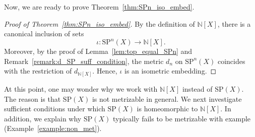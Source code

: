 \documentclass[10pt,a4paper]{article}
\theoremstyle{definition}
\newcommand{\SP}{\mathrm{SP}}
\newcommand{\N}{\mathbb{N}}
\begin{document}
Now, we are ready to prove Theorem~\ref{thm:SPn_iso_embed}.
\begin{proof}[Proof of Theorem~\ref{thm:SPn_iso_embed}]
By the definition of $\N[X]$, there is a canonical inclusion of sets
\[
\iota \colon \SP^n(X) \longrightarrow \N[X].
\]
Moreover, by the proof of Lemma~\ref{lem:top_equal_SPn} and
Remark~\ref{remark:d_SP_suff_condition}, the metric $d_n$ on $\SP^n(X)$
coincides with the restriction of $d_{\N[X]}$. Hence, $\iota$ is an
isometric embedding.
\end{proof}


At this point, one may wonder why we work with $\N[X]$ instead of $\SP(X)$.  
The reason is that $\SP(X)$ is not metrizable in general.  
We next investigate sufficient conditions under which $\SP(X)$ is
homeomorphic to $\N[X]$. In addition, we explain why $\SP(X)$ typically fails
to be metrizable with example (Example~\ref{example:non_met}).
\end{document}
